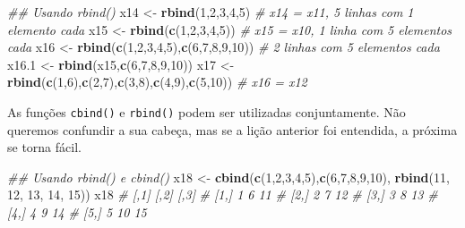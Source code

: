 \documentclass[
]{book}
\newenvironment{Shaded}{\begin{snugshade}}{\end{snugshade}}
\newcommand{\CommentTok}[1]{\textcolor[rgb]{0.56,0.35,0.01}{\textit{#1}}}
\newcommand{\DecValTok}[1]{\textcolor[rgb]{0.00,0.00,0.81}{#1}}
\newcommand{\FloatTok}[1]{\textcolor[rgb]{0.00,0.00,0.81}{#1}}
\newcommand{\KeywordTok}[1]{\textcolor[rgb]{0.13,0.29,0.53}{\textbf{#1}}}
\newcommand{\NormalTok}[1]{#1}
\newcommand{\StringTok}[1]{\textcolor[rgb]{0.31,0.60,0.02}{#1}}
\begin{document}
\begin{Shaded}
\begin{Highlighting}[]
\CommentTok{## Usando rbind()}
\NormalTok{x14 <-}\StringTok{ }\KeywordTok{rbind}\NormalTok{(}\DecValTok{1}\NormalTok{,}\DecValTok{2}\NormalTok{,}\DecValTok{3}\NormalTok{,}\DecValTok{4}\NormalTok{,}\DecValTok{5}\NormalTok{) }\CommentTok{# x14 = x11, 5 linhas com 1 elemento cada }
\NormalTok{x15 <-}\StringTok{ }\KeywordTok{rbind}\NormalTok{(}\KeywordTok{c}\NormalTok{(}\DecValTok{1}\NormalTok{,}\DecValTok{2}\NormalTok{,}\DecValTok{3}\NormalTok{,}\DecValTok{4}\NormalTok{,}\DecValTok{5}\NormalTok{)) }\CommentTok{# x15 = x10, 1 linha com 5 elementos cada}
\NormalTok{x16 <-}\StringTok{ }\KeywordTok{rbind}\NormalTok{(}\KeywordTok{c}\NormalTok{(}\DecValTok{1}\NormalTok{,}\DecValTok{2}\NormalTok{,}\DecValTok{3}\NormalTok{,}\DecValTok{4}\NormalTok{,}\DecValTok{5}\NormalTok{),}\KeywordTok{c}\NormalTok{(}\DecValTok{6}\NormalTok{,}\DecValTok{7}\NormalTok{,}\DecValTok{8}\NormalTok{,}\DecValTok{9}\NormalTok{,}\DecValTok{10}\NormalTok{)) }\CommentTok{# 2 linhas com 5 elementos cada}
\NormalTok{x16}\FloatTok{.1}\NormalTok{ <-}\StringTok{ }\KeywordTok{rbind}\NormalTok{(x15,}\KeywordTok{c}\NormalTok{(}\DecValTok{6}\NormalTok{,}\DecValTok{7}\NormalTok{,}\DecValTok{8}\NormalTok{,}\DecValTok{9}\NormalTok{,}\DecValTok{10}\NormalTok{))}
\NormalTok{x17 <-}\StringTok{ }\KeywordTok{rbind}\NormalTok{(}\KeywordTok{c}\NormalTok{(}\DecValTok{1}\NormalTok{,}\DecValTok{6}\NormalTok{),}\KeywordTok{c}\NormalTok{(}\DecValTok{2}\NormalTok{,}\DecValTok{7}\NormalTok{),}\KeywordTok{c}\NormalTok{(}\DecValTok{3}\NormalTok{,}\DecValTok{8}\NormalTok{),}\KeywordTok{c}\NormalTok{(}\DecValTok{4}\NormalTok{,}\DecValTok{9}\NormalTok{),}\KeywordTok{c}\NormalTok{(}\DecValTok{5}\NormalTok{,}\DecValTok{10}\NormalTok{)) }\CommentTok{# x16 = x12}
\end{Highlighting}
\end{Shaded}

As funções \texttt{cbind()} e \texttt{rbind()}   podem ser utilizadas conjuntamente. Não queremos confundir a sua cabeça, mas se a lição anterior foi entendida, a próxima se torna fácil.

\begin{Shaded}
\begin{Highlighting}[]
\CommentTok{## Usando rbind() e cbind()}
\NormalTok{x18 <-}\StringTok{ }\KeywordTok{cbind}\NormalTok{(}\KeywordTok{c}\NormalTok{(}\DecValTok{1}\NormalTok{,}\DecValTok{2}\NormalTok{,}\DecValTok{3}\NormalTok{,}\DecValTok{4}\NormalTok{,}\DecValTok{5}\NormalTok{),}\KeywordTok{c}\NormalTok{(}\DecValTok{6}\NormalTok{,}\DecValTok{7}\NormalTok{,}\DecValTok{8}\NormalTok{,}\DecValTok{9}\NormalTok{,}\DecValTok{10}\NormalTok{), }\KeywordTok{rbind}\NormalTok{(}\DecValTok{11}\NormalTok{, }\DecValTok{12}\NormalTok{, }\DecValTok{13}\NormalTok{, }\DecValTok{14}\NormalTok{, }\DecValTok{15}\NormalTok{))  }
\NormalTok{x18}
\CommentTok{#      [,1] [,2] [,3]}
\CommentTok{# [1,]    1    6   11}
\CommentTok{# [2,]    2    7   12}
\CommentTok{# [3,]    3    8   13}
\CommentTok{# [4,]    4    9   14}
\CommentTok{# [5,]    5   10   15}
\end{Highlighting}
\end{Shaded}
\end{document}
